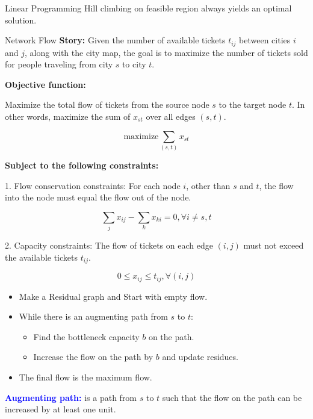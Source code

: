 \documentclass[10pt,a4paper]{article}
\begin{document}
\begin{multicols}{3}
\begin{textbox}{Linear Programming}
     Hill climbing on feasible region always yields 
    an optimal solution.
\end{textbox}

\begin{textbox}{Network Flow}
    {\bf Story:} Given the number of available tickets $t_{ij}$ between cities 
    $i$ and $j$, along with the city map, the goal is to maximize the number of 
    tickets sold for people traveling from city $s$ to city $t$.

    \textbf{Objective function:}

    Maximize the total flow of tickets from the source node $s$ to the target node $t$. In other words, maximize the sum of $x_{st}$ over all edges $(s, t)$.

    \begin{equation}
    \text{maximize} \sum_{(s, t)} x_{st}
    \end{equation}

    \textbf{Subject to the following constraints:}

    1. Flow conservation constraints: For each node $i$, other than $s$ and $t$, the flow into the node must equal the flow out of the node.

    \begin{equation}
    \sum_{j} x_{ij} - \sum_{k} x_{ki} = 0, \forall i \neq s, t
    \end{equation}

    2. Capacity constraints: The flow of tickets on each edge $(i, j)$ must not exceed the available tickets $t_{ij}$.

    \begin{equation}
    0 \le x_{ij} \le t_{ij}, \forall (i, j)
    \end{equation}
    \begin{itemize}
        \item Make a Residual graph and Start with empty flow.
        \item While there is an augmenting path from $s$ to $t$:
            \begin{itemize}
                \item Find the bottleneck capacity $b$ on the path.
                \item Increase the flow on the path by $b$ and update residues.
            \end{itemize}
        \item The final flow is the maximum flow.
    \end{itemize}
    \textcolor{blue}{{\bf Augmenting path:}} is a path from $s$ to $t$ such that the flow on the path can be increased by at least one unit.
    

\end{textbox}
\end{multicols}
\end{document}
